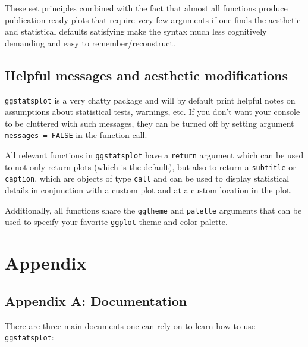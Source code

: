 \documentclass[]{article}
\begin{document}
These set principles combined with the fact that almost all functions produce
publication-ready plots that require very few arguments if one finds the
aesthetic and statistical defaults satisfying make the syntax much less
cognitively demanding and easy to remember/reconstruct.

\hypertarget{helpful-messages-and-aesthetic-modifications}{%
\subsection{Helpful messages and aesthetic modifications}\label{helpful-messages-and-aesthetic-modifications}}

\texttt{ggstatsplot} is a very chatty package and will by default print helpful notes
on assumptions about statistical tests, warnings, etc. If you don't want your
console to be cluttered with such messages, they can be turned off by setting
argument \texttt{messages\ =\ FALSE} in the function call.

All relevant functions in \texttt{ggstatsplot} have a \texttt{return} argument which can be
used to not only return plots (which is the default), but also to return a
\texttt{subtitle} or \texttt{caption}, which are objects of type \texttt{call} and can be used to
display statistical details in conjunction with a custom plot and at a custom
location in the plot.

Additionally, all functions share the \texttt{ggtheme} and \texttt{palette} arguments that can
be used to specify your favorite \texttt{ggplot} theme and color palette.

\newpage

\hypertarget{appendix}{%
\section{Appendix}\label{appendix}}

\hypertarget{appendix-a-documentation}{%
\subsection{Appendix A: Documentation}\label{appendix-a-documentation}}

There are three main documents one can rely on to learn how to use
\texttt{ggstatsplot}:
\end{document}
